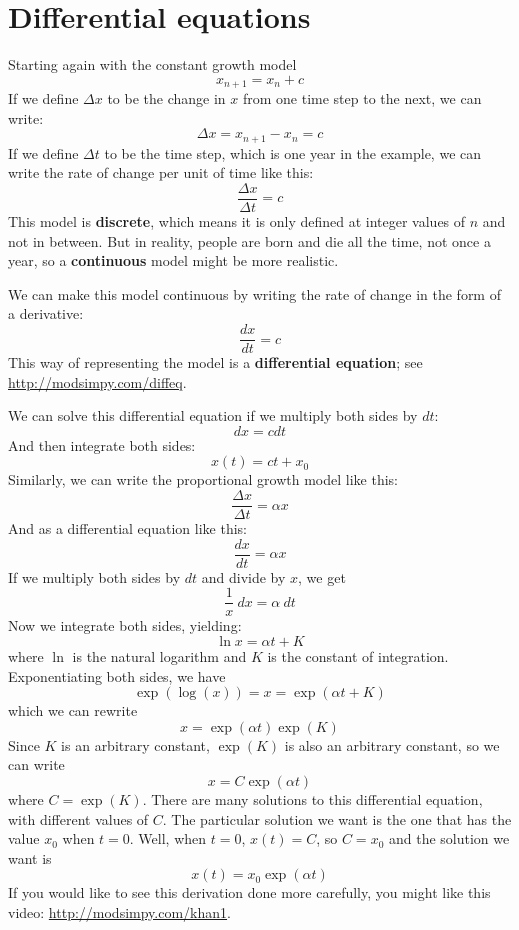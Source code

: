 \documentclass[12pt]{book}
\theoremstyle{exercise}
\begin{document}
\section{Differential equations}
\label{diffeq}

Starting again with the constant growth model
%
\[ x_{n+1} = x_n + c \]
%
If we define $\Delta x$ to be the change in $x$ from one time step to the next, we can write:
%
\[ \Delta x = x_{n+1} - x_n = c \]
%
If we define $\Delta t$ to be the time step, which is one year in the example, we can write the rate of change per unit of time like this:
%
\[ \frac{\Delta x}{\Delta t} = c \]
%
This model is {\bf discrete}, which means it is only defined at integer values of $n$ and not in between.  But in reality, people are born and die all the time, not once a year, so a {\bf continuous} model might be more realistic.

We can make this model continuous by writing the rate of change in the form of a derivative:
%
\[ \frac{dx}{dt} = c \]
%
This way of representing the model is a {\bf differential equation}; see \url{http://modsimpy.com/diffeq}.

We can solve this differential equation if we multiply both sides by $dt$:
%
\[ dx = c dt \]
%
And then integrate both sides:
%
\[ x(t) = c t + x_0 \]
%
Similarly, we can write the proportional growth model like this:
%
\[ \frac{\Delta x}{\Delta t} = \alpha x \]
%
And as a differential equation like this:
%
\[ \frac{dx}{dt} = \alpha x \]
%
If we multiply both sides by $dt$ and divide by $x$, we get
%
\[ \frac{1}{x}~dx = \alpha~dt \] 
%
Now we integrate both sides, yielding:
%
\[ \ln x = \alpha t + K \]
%
where $\ln$ is the natural logarithm and $K$ is the constant of integration.  Exponentiating both sides, we have
%
\[ \exp(\log(x)) = x = \exp(\alpha t + K) \]
%
which we can rewrite
%
\[ x = \exp(\alpha t) \exp(K) \]
%
Since $K$ is an arbitrary constant, $\exp(K)$ is also an arbitrary constant, so we can write
%
\[ x = C \exp(\alpha t) \]
%
where $C = \exp(K)$.  There are many solutions to this differential equation, with different values of $C$.  The particular solution we want is the one that has the value $x_0$ when $t=0$.  Well, when $t=0$, $x(t) = C$, so $C = x_0$ and the solution we want is
%
\[ x(t) = x_0 \exp(\alpha t) \]
%
If you would like to see this derivation done more carefully, you might like this video: \url{http://modsimpy.com/khan1}.
\end{document}
